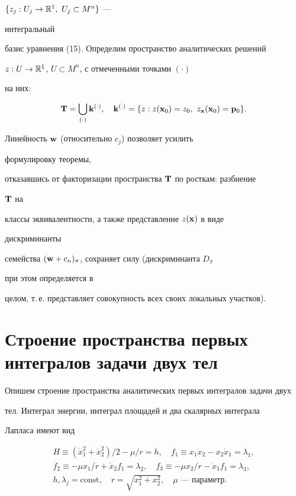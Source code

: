 $\{z_j:U_j\to\Bbb R^1, \ U_j\subset M^n\}$ ---


интегральный


базис уравнения (15). Определим пространство аналитических решений


$z:U\to\Bbb R^1$, $U\subset M^n$, с отмеченными точками $(\cdot)$


на них:


$$


\bold T=\bigcup_{(\cdot)}\bold k^{(\cdot)},\quad


\bold k^{(\cdot)}=\{z:z(\bold x_0)=z_0, \


z_{\bold x}(\bold x_0)=\bold p_0\}.


$$





Линейность $\bold w$ (относительно $c_j$) позволяет усилить


формулировку теоремы,


отказавшись от факторизации пространства $\bold T$ по росткам: разбиение


$\bold T$ на


классы эквивалентности, а также представление $z(\bold x)$ в виде


дискриминанты


семейства $(\bold w+c_n)_\pi$, сохраняет силу (дискриминанта $D_\pi$


при этом определяется в


целом, т.\,е. представляет совокупность всех своих локальных участков).





\section{Строение пространства первых интегралов задачи двух тел}





Опишем строение пространства аналитических первых интегралов задачи двух


тел. Интеграл энергии, интеграл площадей и два скалярных интеграла


Лапласа имеют вид


\begin{gather*}


H\equiv (\Dot x^2_1+\Dot x^2_2)/2-\mu/r=h,\quad


f_1\equiv x_1\Dot x_2-x_2\Dot x_1=\lambda_1, \\


f_2\equiv -\mu x_1/r+\Dot x_2 f_1=\lambda_2,\quad


f_3\equiv -\mu x_2/r-\Dot x_1 f_1=\lambda_3, \\


h,\lambda_j=\text{const},\quad


r=\sqrt{x^2_1+x^2_2},\quad \mu\text{ --- параметр}.


\end{gather*}





